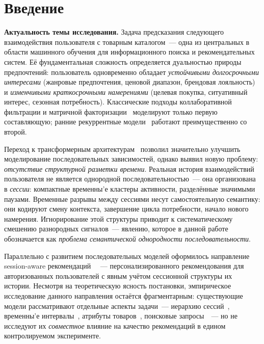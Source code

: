 \chapter*{Введение}

\textbf{Актуальность темы исследования.}
Задача предсказания следующего взаимодействия пользователя с товарным каталогом~--- одна из центральных в области машинного обучения для информационного поиска и рекомендательных систем. 
Её фундаментальная сложность определяется дуальностью природы предпочтений: пользователь одновременно обладает \textit{устойчивыми долгосрочными интересами} (жанровые предпочтения, ценовой диапазон, брендовая лояльность) и \textit{изменчивыми краткосрочными намерениями} (целевая покупка, ситуативный интерес, сезонная потребность). 
Классические подходы коллаборативной фильтрации и матричной факторизации~\cite{rendle2009bpr} моделируют только первую составляющую; ранние рекуррентные модели~\cite{hidasi2016gru4rec} работают преимущественно со второй.

Переход к трансформерным архитектурам~\cite{kang2018sasrec, sun2019bert4rec} позволил значительно улучшить моделирование последовательных зависимостей, однако выявил новую проблему: \textit{отсутствие структурной разметки времени}. 
Реальная история взаимодействий пользователя не является однородной последовательностью~--- она организована в \textit{сессии}: компактные временны'е кластеры активности, разделённые значимыми паузами. 
Временные разрывы между сессиями несут самостоятельную семантику: они кодируют смену контекста, завершение цикла потребности, начало нового намерения. 
Игнорирование этой структуры приводит к систематическому смешению разнородных сигналов~--- явлению, которое в данной работе обозначается как \textit{проблема семантической однородности последовательности}.

Параллельно с развитием последовательных моделей оформилось направление session-aware рекомендаций ~\cite{quadrana2017hrnn}~--- персонализированного рекомендования для авторизованных пользователей с явным учётом сессионной структуры их истории. 
Несмотря на теоретическую ясность постановки, эмпирическое исследование данного направления остаётся фрагментарным: существующие модели рассматривают отдельные аспекты задачи~--- иерархию сессий~\cite{cui2019hierarchical}, временны'е интервалы~\cite{li2020tisasrec}, атрибуты товаров~\cite{rashed2022carca}, поисковые запросы~\cite{he2022queryaware}~--- но не исследуют их \textit{совместное} влияние на качество рекомендаций в едином контролируемом эксперименте.

